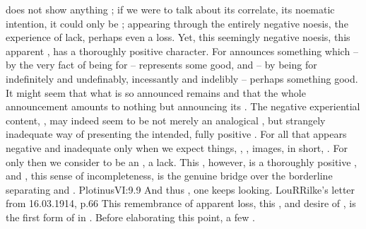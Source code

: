 \pa {} does not show anything ; if we were to talk about
its correlate, its noematic intention, it could only be ;
 appearing through the entirely negative noesis, the experience of
lack, perhaps even a loss. Yet, this seemingly negative noesis, this apparent
, has a thoroughly positive character. For  announces
something which -- by the very fact of being  for -- represents
some good, and -- by being  for indefinitely and undefinably,
incessantly and indelibly -- perhaps something  good. It might
seem that what is so announced remains  and that the whole
announcement amounts to nothing but announcing its .  The negative
experiential content, , may indeed seem to be not merely an
analogical , but strangely inadequate way of presenting
the intended, fully positive .   For all that appears
negative and inadequate only when we expect things, ,
,  images, in short, . For only then
we consider  to be an , a lack. This
, however, is a thoroughly positive , and ,
this sense of incompleteness, is the genuine bridge over the borderline
separating  and .  \citet{That our good is There is
  shown by the very love inborn with the soul; [...] the soul, other than God
  but sprung from Him, must needs love.}{Plotinus}{VI:9.9} And thus , one keeps looking.
\citet{Sometimes I feel as if I were approaching happiness and I stand before a
  flower that blossoms through an old stone wall and I am unable to draw nearer.
  I am left with the feeling of always waiting for happiness, and everything is
  suddenly diminished by the melancholy of having once being able to achieve
  that joy.}{LouR}{Rilke's letter from 16.03.1914, p.66} This remembrance of
apparent loss, this ,  and desire of
, is the first form of  in .  Before elaborating this point, a few .

